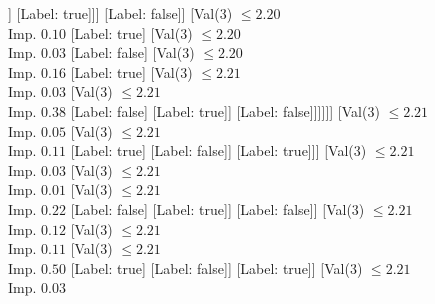 \documentclass[margin=10pt]{standalone}
\begin{document}
\begin{forest}
																								[Val($3$) $ \leq 2.20$ \\ Imp. $0.02$
																									[Val($3$) $ \leq 2.20$ \\ Imp. $0.11$
																										[Label: false]
																										[Val($3$) $ \leq 2.20$ \\ Imp. $0.11$
																											[Val($3$) $ \leq 2.20$ \\ Imp. $0.50$
																												[Label: true]
																												[Label: false]]
																											[Label: true]]]
																									[Label: false]]
																								[Val($3$) $ \leq 2.20$ \\ Imp. $0.10$
																									[Label: true]
																									[Val($3$) $ \leq 2.20$ \\ Imp. $0.03$
																										[Label: false]
																										[Val($3$) $ \leq 2.20$ \\ Imp. $0.16$
																											[Label: true]
																											[Val($3$) $ \leq 2.21$ \\ Imp. $0.03$
																												[Val($3$) $ \leq 2.21$ \\ Imp. $0.38$
																													[Label: false]
																													[Label: true]]
																												[Label: false]]]]]]
																							[Val($3$) $ \leq 2.21$ \\ Imp. $0.05$
																								[Val($3$) $ \leq 2.21$ \\ Imp. $0.11$
																									[Label: true]
																									[Label: false]]
																								[Label: true]]]
																						[Val($3$) $ \leq 2.21$ \\ Imp. $0.03$
																							[Val($3$) $ \leq 2.21$ \\ Imp. $0.01$
																								[Val($3$) $ \leq 2.21$ \\ Imp. $0.22$
																									[Label: false]
																									[Label: true]]
																								[Label: false]]
																							[Val($3$) $ \leq 2.21$ \\ Imp. $0.12$
																								[Val($3$) $ \leq 2.21$ \\ Imp. $0.11$
																									[Val($3$) $ \leq 2.21$ \\ Imp. $0.50$
																										[Label: true]
																										[Label: false]]
																									[Label: true]]
																								[Val($3$) $ \leq 2.21$ \\ Imp. $0.03$

\end{forest}
\end{document}
